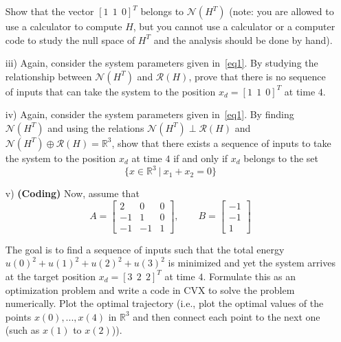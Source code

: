 \begin{homeworkProblem}
\begin{itemize}
            Show that the vector $[ 1 \ \ 1\ \ 0]^T$ belongs to 
            $\mathcal N(H^T)$ (note: you are allowed to use a calculator to 
            compute $H$, but you cannot use a calculator or a computer code 
            to study the null space of $H^T$ and the analysis should be done 
            by hand). 

        \item [iii)] Again, consider the system parameters given in~\eqref{eq1}. 
            By studying the relationship between 
            $\mathcal N(H^T)$ and $ \mathcal R(H)$, prove that there is no 
            sequence of inputs that can take the system to the position 
            $x_d=[ 1 \ \ 1\ \ 0]^T$ at time $4$.

        \item [iv)] Again, consider the system parameters given in~\eqref{eq1}. 
            By finding $\mathcal N(H^T)$ and using the relations 
            $\mathcal N(H^T) \perp \mathcal R(H)$ and $\mathcal N(H^T) \oplus 
            \mathcal R(H)= \mathbb R^3$, show that there exists a sequence of 
            inputs to  take the system to the position $x_d$ at time $4$ if 
            and only if $x_d$ belongs to the set
            \begin{equation}
                \{x\in\mathbb R^3\ | \ x_1+x_2=0\}
            \end{equation}

        \item [v)] \textbf{(Coding)} Now, assume that 
            \begin{equation}
                A= \left[ \begin{array}{ccc} 
                    2 & 0 & 0 \\ 
                    -1 & 1 & 0 \\ 
                    -1 & -1 & 1 \end{array}
                    \right], \qquad 
                B= \left[ \begin{array}{c} 
                    -1 \\ 
                    -1 \\ 
                    1 \end{array}
                    \right]
            \end{equation}

            The goal is to find a sequence of inputs such that the total energy 
            $u(0)^2 + u(1)^2 + u(2)^2 + u(3)^2$ is minimized and yet the system 
            arrives at the target position $x_d=[ 3 \ \ 2\ \ 2]^T$ at time $4$. 
            Formulate this as an optimization problem and write a code in CVX 
            to solve the problem numerically. Plot the optimal trajectory 
            (i.e., plot the optimal values of the points $x(0),...,x(4)$ in 
            $\mathbb R^3$ and then connect each point to the next one (such 
            as $x(1)$ to $x(2)$)).
        

\end{itemize}
\end{homeworkProblem}
